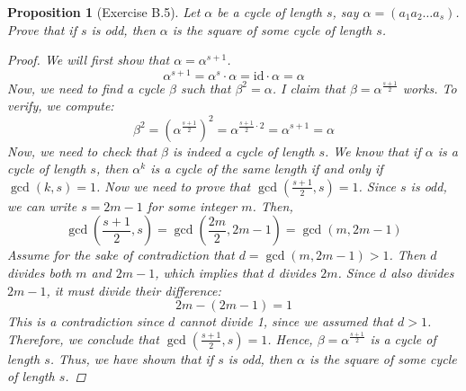 \documentclass[12pt]{article}
\newtheorem{proposition}{Proposition}
\begin{document}
\begin{proposition}[Exercise B.5]
  Let $\alpha$ be a cycle of length $s$, say $\alpha = (a_1 a_2 \ldots a_s)$.
  Prove that if $s$ is odd, then $\alpha$ is the square of some cycle of length $s$.
  \begin{proof}
    We will first show that $\alpha = \alpha^{s + 1}$.
    \[
      \alpha^{s + 1} = \alpha^s \cdot \alpha = \text{id} \cdot \alpha = \alpha
    \]
    Now, we need to find a cycle $\beta$ such that $\beta^2 = \alpha$.
    I claim that $\beta = \alpha^{\frac{s + 1}{2}}$ works.
    To verify, we compute:
    \[
      \beta^2 = \left(\alpha^{\frac{s + 1}{2}}\right)^2 = \alpha^{\frac{s + 1}{2} \cdot 2} = \alpha^{s + 1} = \alpha
    \]
    Now, we need to check that $\beta$ is indeed a cycle of length $s$.
    We know that if $\alpha$ is a cycle of length $s$, then $\alpha^k$ is a cycle of the same length if and only if $\gcd(k, s) = 1$.
    Now we need to prove that $\gcd\left(\frac{s + 1}{2}, s\right) = 1$.
    Since $s$ is odd, we can write $s = 2m  - 1$ for some integer $m$.
    Then,
    \[
      \gcd\left(\frac{s + 1}{2}, s\right) = \gcd\left(\frac{2m}{2}, 2m - 1\right) = \gcd(m, 2m - 1)
    \]
    Assume for the sake of contradiction that $d = \gcd(m, 2m - 1) > 1$.
    Then $d$ divides both $m$ and $2m - 1$, which implies that $d$ divides $2m$.
    Since $d$ also divides $2m - 1$, it must divide their difference:
    \[
      2m - (2m - 1) = 1
    \]
    This is a contradiction since $d$ cannot divide 1, since we assumed that $d > 1$.
    Therefore, we conclude that $\gcd\left(\frac{s + 1}{2}, s\right) = 1$.
    Hence, $\beta = \alpha^{\frac{s + 1}{2}}$ is a cycle of length $s$.
    Thus, we have shown that if $s$ is odd, then $\alpha$ is the square of some cycle of length $s$.
  \end{proof}
\end{proposition}


\end{document}
